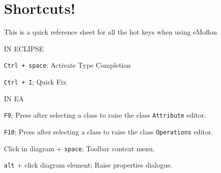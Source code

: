 \newpage
\section{Shortcuts!}

This is a quick reference sheet for all the hot keys when using eMoflon


IN ECLIPSE

\texttt{Ctrl + space}; Activate Type Completion

\texttt{Ctrl + I}; Quick Fix 

IN EA

\texttt{F9}; Press after selecting a class to raise the class \texttt{Attribute} editor.

\texttt{F10}; Press after selecting a class to raise the class \texttt{Operations} editor.

Click in diagram + \texttt{space}; Toolbar context menu.

\texttt{alt} + click diagram element; Raise properties dialogue.